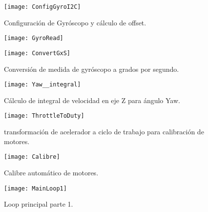 \documentclass[\main/main.tex]{subfiles}
\begin{document}
\begin{landscape}
\begin{figure}
\begin{centering}
\texttt{[image: ConfigGyroI2C]}
\par\end{centering}
\caption{Configuración de Gyróscopo y cálculo de offset.}
\end{figure}

\begin{figure}
\begin{centering}
\texttt{[image: GyroRead]}
\par\end{centering}
\caption{}
\end{figure}

\begin{figure}
\begin{centering}
\texttt{[image: ConvertGxS]}
\par\end{centering}
\caption{Conversión de medida de gyróscopo a grados por segundo.}
\end{figure}

\begin{figure}
\begin{centering}
\texttt{[image: Yaw\_\_integral]}
\par\end{centering}
\caption{Cálculo de integral de velocidad en eje Z para ángulo Yaw.}
\end{figure}

\begin{figure}
\begin{centering}
\texttt{[image: ThrottleToDuty]}
\par\end{centering}
\caption{transformación de acelerador a ciclo de trabajo para calibración de motores.}
\end{figure}

\begin{figure}
\begin{centering}
\texttt{[image: Calibre]}
\par\end{centering}
\caption{Calibre automático de motores.}
\end{figure}

\begin{figure}
\begin{centering}
\texttt{[image: MainLoop1]}
\par\end{centering}
\caption{Loop principal parte 1.}
\end{figure}


\end{landscape}
\end{document}
